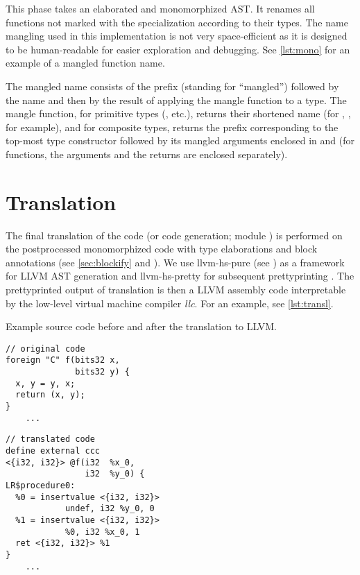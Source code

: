 This phase takes an elaborated and monomorphized AST. It renames all functions not marked with the  specialization according to their types. The name mangling used in this implementation is not very space-efficient as it is designed to be human-readable for easier exploration and debugging. See \cref{lst:mono} for an example of a mangled function name.

\begin{defn}
    The mangled name consists of the  prefix (standing for ``mangled'') followed by the name and then by the result of applying the mangle function to a type. The mangle function, for primitive types (, etc.), returns their shortened name (for , , for example), and for composite types, returns the prefix corresponding to the top-most type constructor followed by its mangled arguments enclosed in  and  (for functions, the arguments and the returns are enclosed separately).
\end{defn}

\section{Translation}
\label{translation}

The final translation of the code (or code generation; module ) is performed on the postprocessed monomorphized code with type elaborations and block annotations (see \cref{sec:blockify} and ). We use llvm-hs-pure (see \cite{llvmHSpure}) as a framework for LLVM AST generation and llvm-hs-pretty for subsequent prettyprinting \cite{llvmHSpretty}. The prettyprinted output of translation is then a LLVM assembly code interpretable by the low-level virtual machine compiler \emph{llc}. For an example, see \cref{lst:transl}.

\begin{codex}
    \caption{Example source code before and after the translation to LLVM.}
    \label{lst:transl}
    \begin{center}
    \begin{minipage}{0.5\linewidth}
    \begin{lstlisting}
// original code
foreign "C" f(bits32 x,
              bits32 y) {
  x, y = y, x;
  return (x, y);
}
    ...\end{lstlisting}
    \end{minipage}%
    \begin{minipage}{0.5\linewidth}
    \begin{lstlisting}
// translated code
define external ccc
<{i32, i32}> @f(i32  %x_0,
                i32  %y_0) {
LR$procedure0:
  %0 = insertvalue <{i32, i32}>
            undef, i32 %y_0, 0
  %1 = insertvalue <{i32, i32}>
            %0, i32 %x_0, 1
  ret <{i32, i32}> %1
}
    ...\end{lstlisting}
    \end{minipage}
    \end{center}
\end{codex}

